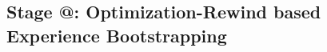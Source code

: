\documentclass{article}
\makeatletter
\theoremstyle{plain}
\theoremstyle{definition}
\theoremstyle{remark}
\newcommand{\Rmnum}[1]{\expandafter\@slowromancap\romannumeral #1@}
\makeatother
\begin{document}
\subsection{Stage \Rmnum{2}: Optimization-Rewind based Experience Bootstrapping}




\end{document}
